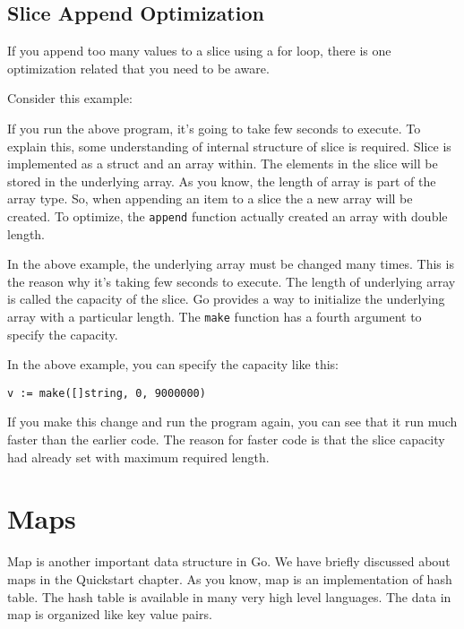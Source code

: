 \subsection{Slice Append Optimization}

If you append too many values to a slice using a
for loop, there is one optimization related that you need to be aware.

Consider this example:



If you run the above program, it's going to take few seconds to
execute.  To explain this, some understanding of internal structure of
slice is required.  Slice is implemented as a struct and an array
within.  The elements in the slice will be stored in the underlying
array.  As you know, the length of array is part of the array type.
So, when appending an item to a slice the a new array will be created.
To optimize, the \texttt{append} function actually created an array
with double length.

In the above example, the underlying array must be changed many times.
This is the reason why it's taking few seconds to execute.  The length
of underlying array is called the capacity of the slice.  Go provides
a way to initialize the underlying array with a particular length.
The \texttt{make} function has a fourth argument to specify the
capacity.

In the above example, you can specify the capacity like this:

\begin{lstlisting}[numbers=none]
v := make([]string, 0, 9000000)
\end{lstlisting}

If you make this change and run the program again, you can see that it
run much faster than the earlier code.  The reason for faster code is
that the slice capacity had already set with maximum required length.

\section{Maps}

Map is another important data structure in Go.  We have
briefly discussed about maps in the Quickstart chapter.  As you know,
map is an implementation of hash table.  The hash table is available
in many very high level languages.  The data in map is organized like
key value pairs.

